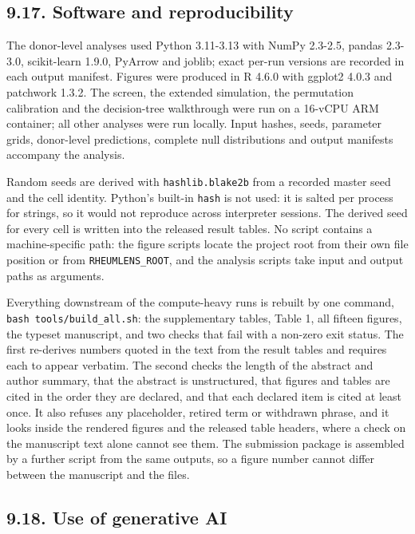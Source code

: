 \subsection{9.17. Software and reproducibility}\label{software-and-reproducibility}

The donor-level analyses used Python 3.11-3.13 with NumPy 2.3-2.5, pandas 2.3-3.0, scikit-learn 1.9.0, PyArrow and joblib; exact per-run versions are recorded in each output manifest. Figures were produced in R 4.6.0 with ggplot2 4.0.3 and patchwork 1.3.2. The screen, the extended simulation, the permutation calibration and the decision-tree walkthrough were run on a 16-vCPU ARM container; all other analyses were run locally. Input hashes, seeds, parameter grids, donor-level predictions, complete null distributions and output manifests accompany the analysis.

Random seeds are derived with \texttt{hashlib.blake2b} from a recorded master seed and the cell identity. Python's built-in \texttt{hash} is not used: it is salted per process for strings, so it would not reproduce across interpreter sessions. The derived seed for every cell is written into the released result tables. No script contains a machine-specific path: the figure scripts locate the project root from their own file position or from \texttt{RHEUMLENS\_ROOT}, and the analysis scripts take input and output paths as arguments.

Everything downstream of the compute-heavy runs is rebuilt by one command, \texttt{bash\ tools/build\_all.sh}: the supplementary tables, Table 1, all fifteen figures, the typeset manuscript, and two checks that fail with a non-zero exit status. The first re-derives numbers quoted in the text from the result tables and requires each to appear verbatim. The second checks the length of the abstract and author summary, that the abstract is unstructured, that figures and tables are cited in the order they are declared, and that each declared item is cited at least once. It also refuses any placeholder, retired term or withdrawn phrase, and it looks inside the rendered figures and the released table headers, where a check on the manuscript text alone cannot see them. The submission package is assembled by a further script from the same outputs, so a figure number cannot differ between the manuscript and the files.

\subsection{9.18. Use of generative AI}\label{use-of-generative-ai}

